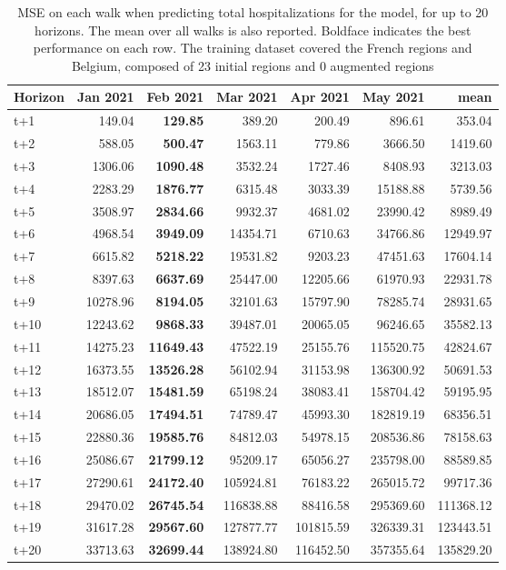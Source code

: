 \begin{table}[H]
\centering
\caption{MSE on each walk when predicting total hospitalizations for the model, for up to 20 horizons. The mean over all walks is also reported. Boldface indicates the best performance on each row. The training dataset covered the French regions and Belgium, composed of 23 initial regions and 0 augmented regions }
\label{tab:MSE_walk_baseline}
\begin{tabular}{lrrrrrr}
\toprule
Horizon &  Jan 2021 &  Feb 2021 &  Mar 2021 &  Apr 2021 &  May 2021 &      mean \\
\midrule
t+1  & 149.04  & \textbf{129.85}  & 389.20  & 200.49  & 896.61  & 353.04  \\
t+2  & 588.05  & \textbf{500.47}  & 1563.11  & 779.86  & 3666.50  & 1419.60  \\
t+3  & 1306.06  & \textbf{1090.48}  & 3532.24  & 1727.46  & 8408.93  & 3213.03  \\
t+4  & 2283.29  & \textbf{1876.77}  & 6315.48  & 3033.39  & 15188.88  & 5739.56  \\
t+5  & 3508.97  & \textbf{2834.66}  & 9932.37  & 4681.02  & 23990.42  & 8989.49  \\
t+6  & 4968.54  & \textbf{3949.09}  & 14354.71  & 6710.63  & 34766.86  & 12949.97  \\
t+7  & 6615.82  & \textbf{5218.22}  & 19531.82  & 9203.23  & 47451.63  & 17604.14  \\
t+8  & 8397.63  & \textbf{6637.69}  & 25447.00  & 12205.66  & 61970.93  & 22931.78  \\
t+9  & 10278.96  & \textbf{8194.05}  & 32101.63  & 15797.90  & 78285.74  & 28931.65  \\
t+10  & 12243.62  & \textbf{9868.33}  & 39487.01  & 20065.05  & 96246.65  & 35582.13  \\
t+11  & 14275.23  & \textbf{11649.43}  & 47522.19  & 25155.76  & 115520.75  & 42824.67  \\
t+12  & 16373.55  & \textbf{13526.28}  & 56102.94  & 31153.98  & 136300.92  & 50691.53  \\
t+13  & 18512.07  & \textbf{15481.59}  & 65198.24  & 38083.41  & 158704.42  & 59195.95  \\
t+14  & 20686.05  & \textbf{17494.51}  & 74789.47  & 45993.30  & 182819.19  & 68356.51  \\
t+15  & 22880.36  & \textbf{19585.76}  & 84812.03  & 54978.15  & 208536.86  & 78158.63  \\
t+16  & 25086.67  & \textbf{21799.12}  & 95209.17  & 65056.27  & 235798.00  & 88589.85  \\
t+17  & 27290.61  & \textbf{24172.40}  & 105924.81  & 76183.22  & 265015.72  & 99717.36  \\
t+18  & 29470.02  & \textbf{26745.54}  & 116838.88  & 88416.58  & 295369.60  & 111368.12  \\
t+19  & 31617.28  & \textbf{29567.60}  & 127877.77  & 101815.59  & 326339.31  & 123443.51  \\
t+20  & 33713.63  & \textbf{32699.44}  & 138924.80  & 116452.50  & 357355.64  & 135829.20  \\

\bottomrule
\end{tabular}
\end{table}
